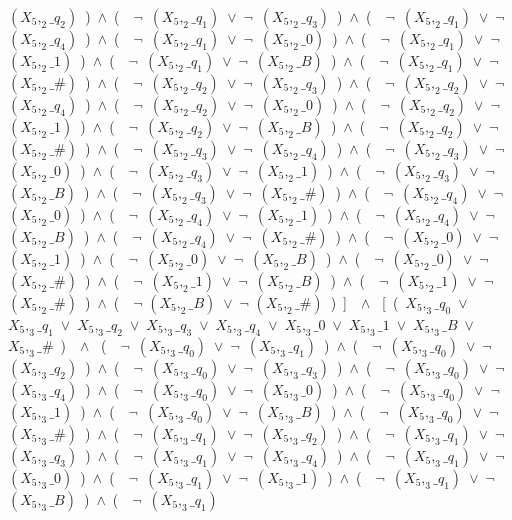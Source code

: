 ﻿\documentclass[a4paper,10pt]{article}
\begin{document}
$(X_5,_2\_q_2)$\ )\ $\wedge$\ (\ \ $\neg$\ $(X_5,_2\_q_1)$\ $\vee$\ $\neg$\ $(X_5,_2\_q_3)$\ )\ $\wedge$\ (\ \ $\neg$\ $(X_5,_2\_q_1)$\ $\vee$\ $\neg$\ $(X_5,_2\_q_4)$\ )\ $\wedge$\ (\ \ $\neg$\ $(X_5,_2\_q_1)$\ $\vee$\ $\neg$\ $(X_5,_2\_0)$\ )\ $\wedge$\ (\ \ $\neg$\ $(X_5,_2\_q_1)$\ $\vee$\ $\neg$\ $(X_5,_2\_1)$\ )\ $\wedge$\ (\ \ $\neg$\ $(X_5,_2\_q_1)$\ $\vee$\ $\neg$\ $(X_5,_2\_B)$\ )\ $\wedge$\ (\ \ $\neg$\ $(X_5,_2\_q_1)$\ $\vee$\ $\neg$\ $(X_5,_2\_\#)$\ )\ $\wedge$\ (\ \ $\neg$\ $(X_5,_2\_q_2)$\ $\vee$\ $\neg$\ $(X_5,_2\_q_3)$\ )\ $\wedge$\ (\ \ $\neg$\ $(X_5,_2\_q_2)$\ $\vee$\ $\neg$\ $(X_5,_2\_q_4)$\ )\ $\wedge$\ (\ \ $\neg$\ $(X_5,_2\_q_2)$\ $\vee$\ $\neg$\ $(X_5,_2\_0)$\ )\ $\wedge$\ (\ \ $\neg$\ $(X_5,_2\_q_2)$\ $\vee$\ $\neg$\ $(X_5,_2\_1)$\ )\ $\wedge$\ (\ \ $\neg$\ $(X_5,_2\_q_2)$\ $\vee$\ $\neg$\ $(X_5,_2\_B)$\ )\ $\wedge$\ (\ \ $\neg$\ $(X_5,_2\_q_2)$\ $\vee$\ $\neg$\ $(X_5,_2\_\#)$\ )\ $\wedge$\ (\ \ $\neg$\ $(X_5,_2\_q_3)$\ $\vee$\ $\neg$\ $(X_5,_2\_q_4)$\ )\ $\wedge$\ (\ \ $\neg$\ $(X_5,_2\_q_3)$\ $\vee$\ $\neg$\ $(X_5,_2\_0)$\ )\ $\wedge$\ (\ \ $\neg$\ $(X_5,_2\_q_3)$\ $\vee$\ $\neg$\ $(X_5,_2\_1)$\ )\ $\wedge$\ (\ \ $\neg$\ $(X_5,_2\_q_3)$\ $\vee$\ $\neg$\ $(X_5,_2\_B)$\ )\ $\wedge$\ (\ \ $\neg$\ $(X_5,_2\_q_3)$\ $\vee$\ $\neg$\ $(X_5,_2\_\#)$\ )\ $\wedge$\ (\ \ $\neg$\ $(X_5,_2\_q_4)$\ $\vee$\ $\neg$\ $(X_5,_2\_0)$\ )\ $\wedge$\ (\ \ $\neg$\ $(X_5,_2\_q_4)$\ $\vee$\ $\neg$\ $(X_5,_2\_1)$\ )\ $\wedge$\ (\ \ $\neg$\ $(X_5,_2\_q_4)$\ $\vee$\ $\neg$\ $(X_5,_2\_B)$\ )\ $\wedge$\ (\ \ $\neg$\ $(X_5,_2\_q_4)$\ $\vee$\ $\neg$\ $(X_5,_2\_\#)$\ )\ $\wedge$\ (\ \ $\neg$\ $(X_5,_2\_0)$\ $\vee$\ $\neg$\ $(X_5,_2\_1)$\ )\ $\wedge$\ (\ \ $\neg$\ $(X_5,_2\_0)$\ $\vee$\ $\neg$\ $(X_5,_2\_B)$\ )\ $\wedge$\ (\ \ $\neg$\ $(X_5,_2\_0)$\ $\vee$\ $\neg$\ $(X_5,_2\_\#)$\ )\ $\wedge$\ (\ \ $\neg$\ $(X_5,_2\_1)$\ $\vee$\ $\neg$\ $(X_5,_2\_B)$\ )\ $\wedge$\ (\ \ $\neg$\ $(X_5,_2\_1)$\ $\vee$\ $\neg$\ $(X_5,_2\_\#)$\ )\ $\wedge$\ (\ \ $\neg$ $(X_5,_2\_B)$\ $\vee$\ $\neg$ $(X_5,_2\_\#)$\ )\ ]\ \ $\wedge$ \ [\ (\ $X_5,_3\_q_0$\ $\vee$\ $X_5,_3\_q_1$\ $\vee$\ $X_5,_3\_q_2$\ $\vee$\ $X_5,_3\_q_3$\ $\vee$\ $X_5,_3\_q_4$\ $\vee$\ $X_5,_3\_0$\ $\vee$\ $X_5,_3\_1$\ $\vee$\ $X_5,_3\_B$\ $\vee$\ $X_5,_3\_\#$\ )\ \ $\wedge$ \ (\ \ $\neg$\ $(X_5,_3\_q_0)$\ $\vee$\ $\neg$\ $(X_5,_3\_q_1)$\ )\ $\wedge$\ (\ \ $\neg$\ $(X_5,_3\_q_0)$\ $\vee$\ $\neg$\ $(X_5,_3\_q_2)$\ )\ $\wedge$\ (\ \ $\neg$\ $(X_5,_3\_q_0)$\ $\vee$\ $\neg$\ $(X_5,_3\_q_3)$\ )\ $\wedge$\ (\ \ $\neg$\ $(X_5,_3\_q_0)$\ $\vee$\ $\neg$\ $(X_5,_3\_q_4)$\ )\ $\wedge$\ (\ \ $\neg$\ $(X_5,_3\_q_0)$\ $\vee$\ $\neg$\ $(X_5,_3\_0)$\ )\ $\wedge$\ (\ \ $\neg$\ $(X_5,_3\_q_0)$\ $\vee$\ $\neg$\ $(X_5,_3\_1)$\ )\ $\wedge$\ (\ \ $\neg$\ $(X_5,_3\_q_0)$\ $\vee$\ $\neg$\ $(X_5,_3\_B)$\ )\ $\wedge$\ (\ \ $\neg$\ $(X_5,_3\_q_0)$\ $\vee$\ $\neg$\ $(X_5,_3\_\#)$\ )\ $\wedge$\ (\ \ $\neg$\ $(X_5,_3\_q_1)$\ $\vee$\ $\neg$\ $(X_5,_3\_q_2)$\ )\ $\wedge$\ (\ \ $\neg$\ $(X_5,_3\_q_1)$\ $\vee$\ $\neg$\ $(X_5,_3\_q_3)$\ )\ $\wedge$\ (\ \ $\neg$\ $(X_5,_3\_q_1)$\ $\vee$\ $\neg$\ $(X_5,_3\_q_4)$\ )\ $\wedge$\ (\ \ $\neg$\ $(X_5,_3\_q_1)$\ $\vee$\ $\neg$\ $(X_5,_3\_0)$\ )\ $\wedge$\ (\ \ $\neg$\ $(X_5,_3\_q_1)$\ $\vee$\ $\neg$\ $(X_5,_3\_1)$\ )\ $\wedge$\ (\ \ $\neg$\ $(X_5,_3\_q_1)$\ $\vee$\ $\neg$\ $(X_5,_3\_B)$\ )\ $\wedge$\ (\ \ $\neg$\ $(X_5,_3\_q_1)$\ 
\end{document}
